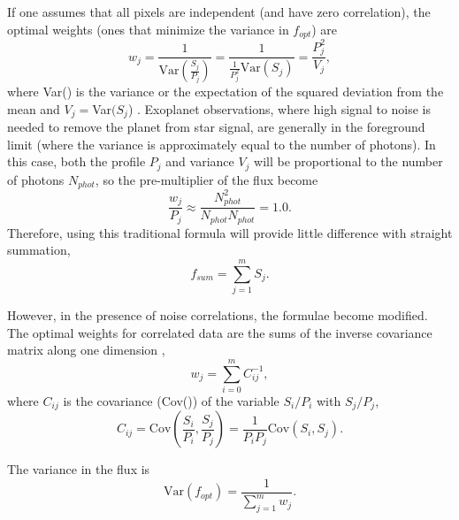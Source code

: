 \documentclass[]{aastex62}
\begin{document}
If one assumes that all pixels are independent (and have zero correlation), the optimal weights (ones that minimize the variance in $f_{opt}$) are
\begin{equation}\label{eq:varianceweights}
w_j = \frac{1}{\mathrm{Var}(\frac{S_j}{P_j})} = \frac{1}{\frac{1}{P_j^2} \mathrm{Var}(S_j)} = \frac{P_j^2}{V_j},
\end{equation}
where Var() is the variance or the expectation of the squared deviation from the mean and $V_j =$Var$(S_j$) \citep{horne1986optimalE}.
Exoplanet observations, where high signal to noise is needed to remove the planet from star signal, are generally in the foreground limit (where the variance is approximately equal to the number of photons).
In this case, both the profile $P_j$ and variance $V_j$ will be proportional to the number of photons $N_{phot}$, so the pre-multiplier of the flux become
\begin{equation*}
\frac{w_j}{P_j} \approx \frac{N_{phot}^2}{N_{phot} N_{phot}} = 1.0.
\end{equation*}
Therefore, using this traditional formula will provide little difference with straight summation,
\begin{equation}\label{eq:StraightSummation}
f_{sum} = \sum_{j=1}^{m} S_j.
\end{equation} 

However, in the presence of noise correlations, the formulae become modified.
The optimal weights for correlated data are the sums of the inverse covariance matrix along one dimension  \citep{schmelling1995averagingCorrelatedData},
\begin{equation}\label{eq:covarianceweights}
w_j = \sum_{i=0}^{m} C_{ij}^{-1},
\end{equation}
where $C_{ij}$ is the covariance (Cov()) of the variable $S_i/P_i$ with $S_j/P_j$,
\begin{equation}
C_{ij} = \mathrm{Cov}\left(\frac{S_i}{P_i},\frac{S_j}{P_j}\right) = \frac{1}{P_i P_j} \mathrm{Cov}(S_i,S_j).
\end{equation}


The variance in the flux is
\begin{equation}
\mathrm{Var}(f_{opt}) = \frac{1}{\sum_{j=1}^m w_j}.
\end{equation}
\end{document}

